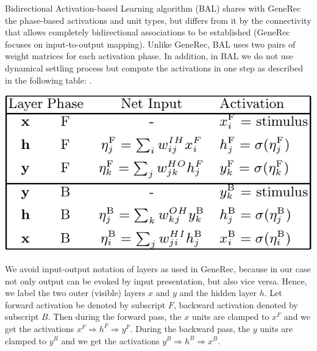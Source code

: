 
Bidirectional Activation-based Learning algorithm (BAL) shares with GeneRec
the phase-based activations and unit types, but differs from it by the connectivity
that allows completely bidirectional associations to be established (GeneRec
focuses on input-to-output mapping). Unlike GeneRec, BAL uses two pairs of
weight matrices for each activation phase. In addition, in BAL we do not use
dynamical settling process but compute the activations in one step as described
in the following table: \citet{farkas2013bal}.

\begin{center} 
\includegraphics[scale=0.5]{img/table_bal.png} 
\citet{farkas2013bal} 
\end{center}

We avoid input-output notation of layers as used in GeneRec, because in our
case not only output can be evoked by input presentation, but also vice versa.
Hence, we label the two outer (visible) layers $x$ and $y$ and the hidden layer $h$.
Let forward activation be denoted by subscript $F$, backward activation denoted
by subscript $B$. Then during the forward pass, the $x$ units are clamped to $x^F$
and we get the activations $x^F \Rightarrow h^F \Rightarrow y^F$. During the backward pass, the $y$
units are clamped to $y^B$ and we get the activations $y^B \Rightarrow h^B \Rightarrow x^B$.

